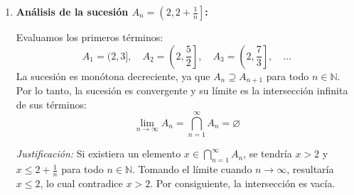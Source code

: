 \begin{problema}
\begin{enumerate}[label=\alph*)]
    \item \textbf{Análisis de la sucesión $A_n = \left(2, 2 + \frac{1}{n}\right]$:}
    
    Evaluamos los primeros términos:
    \[
        A_1 = (2, 3], \quad A_2 = \left(2, \frac{5}{2}\right], \quad A_3 = \left(2, \frac{7}{3}\right], \quad \dots
    \]
    La sucesión es monótona decreciente, ya que $A_n \supseteq A_{n+1}$ para todo $n \in \mathbb{N}$. Por lo tanto, la sucesión es convergente y su límite es la intersección infinita de sus términos:
    \[
        \lim_{n \to \infty} A_n = \bigcap_{n=1}^\infty A_n = \varnothing
    \]
    
    \textit{Justificación:} Si existiera un elemento $x \in \bigcap_{n=1}^\infty A_n$, se tendría $x > 2$ y $x \le 2 + \frac{1}{n}$ para todo $n \in \mathbb{N}$. Tomando el límite cuando $n \to \infty$, resultaría $x \le 2$, lo cual contradice $x > 2$. Por consiguiente, la intersección es vacía.
\end{enumerate}
\end{problema}
\newpage
